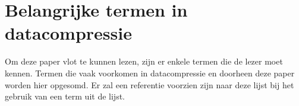 \chapter{Belangrijke termen in datacompressie}
\label{ch:termen}

Om deze paper vlot te kunnen lezen, zijn er enkele termen die de lezer moet kennen. Termen die vaak voorkomen in datacompressie en doorheen deze paper worden hier opgesomd. Er zal een referentie voorzien zijn naar deze lijst bij het gebruik van een term uit de lijst.

\glsaddall
\printglossary[title=Woordenlijst]
